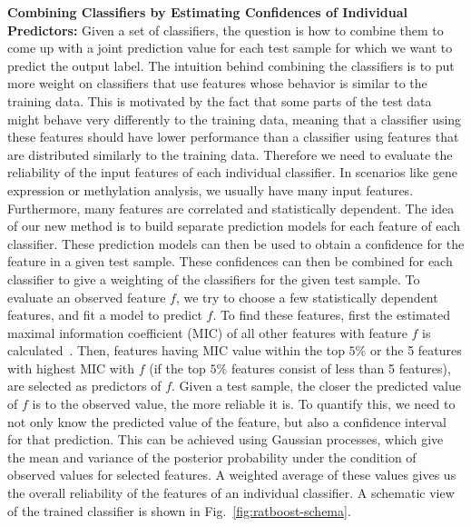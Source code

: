 \textbf{Combining Classifiers by Estimating Confidences of Individual Predictors:}
Given a set of classifiers, the question is how to combine them to come up with a joint prediction value for each test sample for which we want to predict the output label. The intuition behind combining the classifiers is to put more weight on classifiers that use features whose behavior is similar to the training data. This is motivated by the fact that some parts of the test data might behave very differently to the training data, meaning that a classifier using these features should have lower performance than a classifier using features that are distributed similarly to the training data. Therefore we need to evaluate the reliability of the input features of each individual classifier. In scenarios like gene expression or methylation analysis, we usually have many input features. Furthermore, many features are correlated and statistically dependent. The idea of our new method is to build separate prediction models for each feature of each classifier. These prediction models can then be used to obtain a confidence for the feature in a given test sample. These confidences can then be combined for each classifier to give a weighting of the classifiers for the given test sample.
To evaluate an observed feature $f$, we try to choose a few statistically dependent features, and fit a model to predict $f$. 
To find these features, first the estimated maximal information coefficient (MIC) of all other features with feature $f$ is calculated~\cite{reshef2011detecting}. Then, features having MIC value within the top $5\%$ or the 5 features with highest MIC with $f$ (if the top $5\%$ features consist of less than 5 features), are selected as predictors of $f$.
Given a test sample, the closer the predicted value of $f$ is to the observed value, the more reliable it is. To quantify this, we need to not only know the predicted value of the feature, but also a confidence interval for that prediction. This can be achieved using Gaussian processes, which give the mean and variance of the posterior probability under the condition of observed values for selected features. A weighted average of these values gives us the overall reliability of the features of an individual classifier. A schematic view of the trained classifier is shown in Fig.~\ref{fig:ratboost-schema}.

